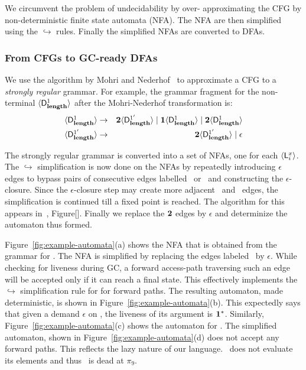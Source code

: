 \documentclass[9pt]{sigplanconf}
\begin{document}
We circumvent the problem  of undecidability by over- approximating the
CFG by non-deterministic finite state automata (NFA). The NFA are then
simplified using  the $\hookrightarrow$ rules.  Finally the simplified
NFAs are converted to DFAs.

\subsubsection{From CFGs to GC-ready DFAs}
\label{sec:NFA-approx}
 We use  the algorithm by Mohri  and Nederhof~\cite{mohri00regular} to
 approximate a CFG to a {\em strongly regular\/} grammar.  For
 example, the grammar
 fragment  for  the  non-terminal  $\var{\Df{\length}{1}}$  after  the
 Mohri-Nederhof transformation is:
 \begin{eqnarray*}
   \var{\Df{\length}{1}} &\rightarrow& \clazy\var{\Df{\length}{1'}} \mid
   \acdr\var{\Df{\length}{1}}
   \mid \clazy\var{\Df{\length}{1}}\\
   \var{\Df{\length}{1'}} &\rightarrow& \clazy\var{\Df{\length}{1'}}
   \mid \epsilon
 \end{eqnarray*}

The strongly regular grammar is converted into a set of
NFAs,   one  for   each  $\var{\Lanv{i}{x}}$.   The  $\hookrightarrow$
simplification  is now  done  on the  NFAs  by repeatedly  introducing
$\epsilon$  edges  to  bypass  pairs  of  consecutive  edges  labelled
\bcar\acar\ or \bcdr\acdr\  and constructing the
$\epsilon$-closure. Since the $\epsilon$-closure step may create more
adjacent \bcar\acar\ and \bcdr\acdr\  edges, the simplification is
 continued  till a  fixed point is  reached. The algorithm  for this
appears  in~\cite{asati14lgc},   Figure[].  Finally  we   replace  the
${\mathbf{2}}$  edges  by  $\epsilon$  and determinize  the  automaton  thus
formed.

Figure~\ref{fig:example-automata}(a)  shows the  NFA that  is obtained
from the  grammar for  .  The  NFA is
simplified by replacing the edges labeled \clazy\ by $\epsilon$. While
checking for liveness during GC, a forward access-path traversing such
an edge  will be accepted  only if it  can reach a final  state.  This
effectively implements  the $\hookrightarrow$ simplification  rule for
\clazy for forward paths. The resulting automaton, made deterministic,
is shown in Figure~\ref{fig:example-automata}(b). This expectedly says
that  given  a demand  $\epsilon$  on  \length,  the liveness  of  its
argument             is             $\mathbf{1}^{*}$.            Similarly,
Figure~\ref{fig:example-automata}(c)    shows   the    automaton   for
. The simplified automaton, shown in
Figure~\ref{fig:example-automata}(d) does not accept any forward
paths. This reflects the lazy nature of our language. \length\  does not
evaluate its elements and thus \pa\ is dead at $\pi_9$.
\end{document}
